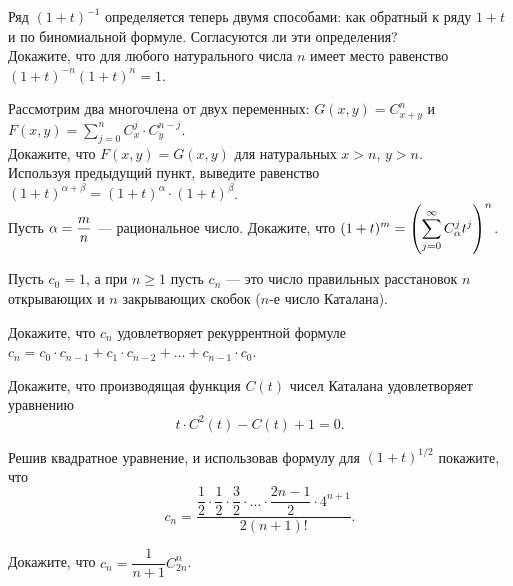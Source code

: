 \documentclass[a4paper,12pt]{article}
\renewcommand{\binom}[2]{C_{#1}^{#2}}
\begin{document}
Ряд $(1+t)^{-1}$ определяется теперь двумя способами:
как обратный к ряду $1+t$ и по биномиальной формуле.
Согласуются ли эти определения?
\\
Докажите, что для любого натурального числа $n$ имеет место
равенство $(1+t)^{-n}(1+t)^n=1$.








  Рассмотрим два многочлена от двух переменных:
$G(x,y) = \displaystyle\binom{x+y}n$ и  $\displaystyle F(x,y) = \sum\limits_{j=0}^n \displaystyle\binom{x}j \cdot \displaystyle\binom{y}{n-j}$.
\\ Докажите, что $F(x,y)=G(x,y)$ для натуральных $x > n$, $y > n$.
\\ Используя предыдущий пункт, выведите равенство
$(1+t)^{\alpha+\beta} = (1+t)^{\alpha}\cdot (1+t)^{\beta}$.
\\
Пусть $\alpha=\dfrac{m}{n}$ — рациональное число.
Докажите, что $\displaystyle(1+t)^{m}=\hr{\sum\limits_{j=0}^{\infty} \displaystyle\binom{\alpha}j t^j}^n$.







Пусть $c_0=1$, а при $n\geq1$ пусть
$c_n$ --- это число правильных расстановок $n$ открывающих и
$n$ закрывающих скобок ($n$-е число Каталана).

 Докажите, что $c_n$ удовлетворяет рекуррентной формуле $c_n = c_0\cdot c_{n-1} + c_1 \cdot c_{n-2} + \ldots + c_{n-1}\cdot c_0$.

 Докажите, что производящая функция $C(t)$ чисел Каталана удовлетворяет уравнению $$t \cdot C^2(t) - C(t)+1=0.$$

 Решив квадратное уравнение, и использовав формулу для $(1+t)^{1/2}$ покажите, что
$$c_n = \dfrac{\dfrac{1}{2}\cdot \dfrac{1}{2}\cdot \dfrac{3}{2}\cdot \ldots \cdot \dfrac{2n-1}{2} \cdot 4^{n+1}}{2(n+1)!}.$$

 Докажите, что $c_n = \dfrac{1}{n+1} C_{2n}^n$.






\end{document}
